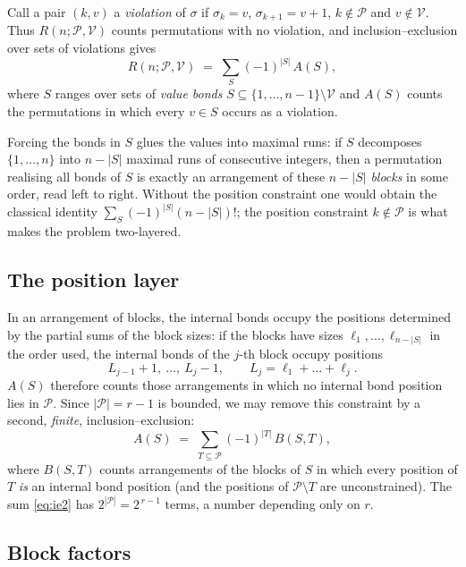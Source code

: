 \documentclass[11pt]{article}
\theoremstyle{definition}
\begin{document}
Call a pair $(k,v)$ a \emph{violation} of $\sigma$ if $\sigma_k=v$,
$\sigma_{k+1}=v+1$, $k\notin\mathcal{P}$ and $v\notin\mathcal{V}$. Thus
$R(n;\mathcal{P},\mathcal{V})$ counts permutations with no violation, and
inclusion--exclusion over sets of violations gives
\begin{equation}\label{eq:ie1}
  R(n;\mathcal{P},\mathcal{V})
  \;=\; \sum_{S} (-1)^{|S|}\, A(S),
\end{equation}
where $S$ ranges over sets of \emph{value bonds}
$S\subseteq\{1,\dots,n-1\}\setminus\mathcal{V}$ and $A(S)$ counts the
permutations in which every $v\in S$ occurs as a violation.

Forcing the bonds in $S$ glues the values into maximal runs: if $S$ decomposes
$\{1,\dots,n\}$ into $n-|S|$ maximal runs of consecutive integers, then a
permutation realising all bonds of $S$ is exactly an arrangement of these
$n-|S|$ \emph{blocks} in some order, read left to right. Without the position
constraint one would obtain the classical identity
$\sum_S(-1)^{|S|}(n-|S|)!$; the position constraint $k\notin\mathcal{P}$ is
what makes the problem two-layered.

\subsection*{The position layer}

In an arrangement of blocks, the internal bonds occupy the positions
determined by the partial sums of the block sizes: if the blocks have sizes
$\ell_1,\dots,\ell_{n-|S|}$ in the order used, the internal bonds of the $j$-th
block occupy positions
\[
  L_{j-1}+1,\ \dots,\ L_{j}-1,
  \qquad L_j=\ell_1+\dots+\ell_j .
\]
$A(S)$ therefore counts those arrangements in which no internal bond position
lies in $\mathcal{P}$. Since $|\mathcal{P}|=r-1$ is bounded, we may remove this
constraint by a second, \emph{finite}, inclusion--exclusion:
\begin{equation}\label{eq:ie2}
  A(S) \;=\; \sum_{T\subseteq\mathcal{P}} (-1)^{|T|}\, B(S,T),
\end{equation}
where $B(S,T)$ counts arrangements of the blocks of $S$ in which every
position of $T$ \emph{is} an internal bond position (and the positions of
$\mathcal{P}\setminus T$ are unconstrained). The sum \eqref{eq:ie2} has
$2^{|\mathcal{P}|}=2^{\,r-1}$ terms, a number depending only on $r$.

\subsection*{Block factors}
\end{document}
